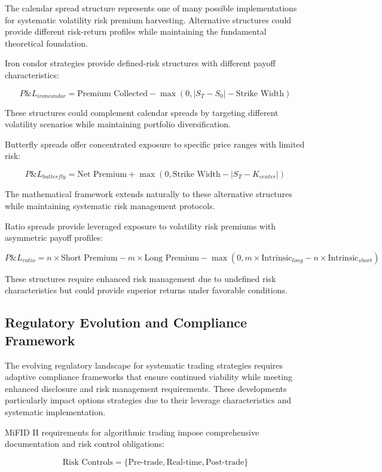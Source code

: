 \documentclass[
  american,
  11pt,
  11pt,
  letterpaper,
  onecolumn]{article}
\begin{document}
The calendar spread structure represents one of many possible
implementations for systematic volatility risk premium harvesting.
Alternative structures could provide different risk-return profiles
while maintaining the fundamental theoretical foundation.

Iron condor strategies provide defined-risk structures with different
payoff characteristics:

\[P\&L_{iron condor} = \text{Premium Collected} - \max(0, |S_T - S_0| - \text{Strike Width})\]

These structures could complement calendar spreads by targeting
different volatility scenarios while maintaining portfolio
diversification.

Butterfly spreads offer concentrated exposure to specific price ranges
with limited risk:

\[P\&L_{butterfly} = \text{Net Premium} + \max(0, \text{Strike Width} - |S_T - K_{center}|)\]

The mathematical framework extends naturally to these alternative
structures while maintaining systematic risk management protocols.

Ratio spreads provide leveraged exposure to volatility risk premiums
with asymmetric payoff profiles:

\[P\&L_{ratio} = n \times \text{Short Premium} - m \times \text{Long Premium} - \max(0, m \times \text{Intrinsic}_{long} - n \times \text{Intrinsic}_{short})\]

These structures require enhanced risk management due to undefined risk
characteristics but could provide superior returns under favorable
conditions.

\subsection{Regulatory Evolution and Compliance
Framework}\label{regulatory-evolution-and-compliance-framework}

The evolving regulatory landscape for systematic trading strategies
requires adaptive compliance frameworks that ensure continued viability
while meeting enhanced disclosure and risk management requirements.
These developments particularly impact options strategies due to their
leverage characteristics and systematic implementation.

MiFID II requirements for algorithmic trading impose comprehensive
documentation and risk control obligations:

\[\text{Risk Controls} = \{\text{Pre-trade}, \text{Real-time}, \text{Post-trade}\}\]
\end{document}
